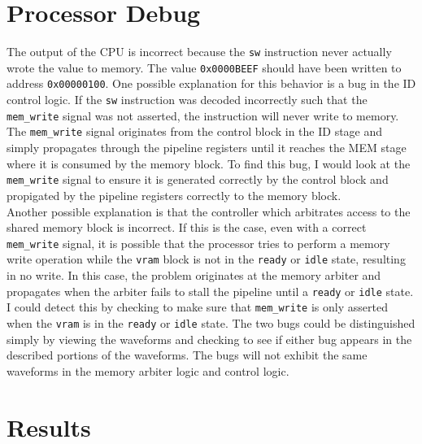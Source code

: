 \documentclass[12pt]{article}
\begin{document}
\newpage

\newpage
\section{Processor Debug}

The output of the CPU is incorrect  because the \texttt{sw} instruction never actually wrote the value to memory.  The value \texttt{0x0000BEEF} should have been written to address \texttt{0x00000100}. One possible explanation for this behavior is a bug in the ID control logic. If the \texttt{sw} instruction was decoded incorrectly such that the \texttt{mem\_write} signal was not asserted, the instruction will never write to memory. The \texttt{mem\_write} signal originates from the control block in the ID stage and simply propagates through the pipeline registers until it reaches the MEM stage where it is consumed by the memory block. To find this bug, I would look at the \texttt{mem\_write} signal to ensure it is generated correctly by the control block and propigated by the pipeline registers correctly to the memory block.\\

Another possible explanation is that the controller which arbitrates access to the shared memory block is incorrect. If this is the case, even with a correct \texttt{mem\_write} signal, it is possible that the processor tries to perform a memory write operation while the \texttt{vram} block is not in the \texttt{ready} or \texttt{idle} state, resulting in no write. In this case, the problem originates at the memory arbiter and propagates when the arbiter fails to stall the pipeline until a \texttt{ready} or \texttt{idle} state. I could detect this by checking to make sure that \texttt{mem\_write} is only asserted when the \texttt{vram} is in the \texttt{ready} or \texttt{idle} state. The two bugs could be distinguished simply by viewing the waveforms and checking to see if either bug appears in the described portions of the waveforms. The bugs will not exhibit the same waveforms in the memory arbiter logic and control logic.\\

\newpage
  \section{Results}
  
\end{document}
